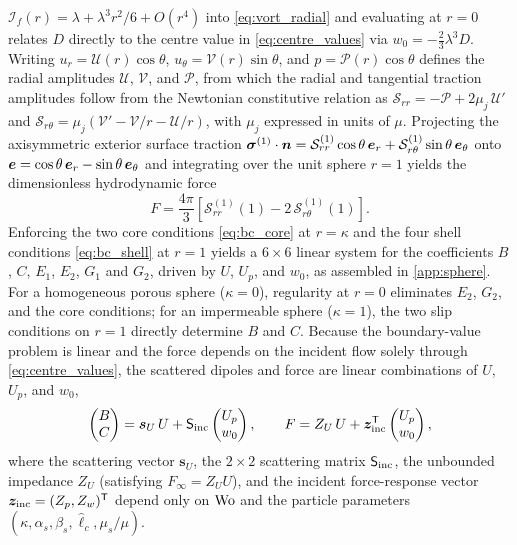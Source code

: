 $\mathcal I_f(r)=\lambda+\lambda^3r^2/6+O(r^4)$ into \cref{eq:vort_radial} and evaluating at $r=0$ relates $D$ directly to
the centre value in \cref{eq:centre_values} via $w_0=-\tfrac23\lambda^3D$. Writing $u_r=\mathcal U(r)\cos\theta$,
$u_\theta=\mathcal V(r)\sin\theta$, and $p=\mathcal P(r)\cos\theta$ defines the radial amplitudes $\mathcal U$, $\mathcal V$,
and $\mathcal P$, from which the radial and tangential traction amplitudes follow from the Newtonian constitutive relation
as $\mathcal S_{rr}=-\mathcal P+2\mu_j\,\mathcal U'$ and
$\mathcal S_{r\theta}=\mu_j(\mathcal V'-\mathcal V/r-\mathcal U/r)$, with $\mu_j$ expressed in units of $\mu$. Projecting
the axisymmetric exterior surface traction $\bm{\sigma}^{(1)}\cdot\bm{n}=\mathcal S^{(1)}_{rr}\cos\theta\,\bm{e}_r+\mathcal
S^{(1)}_{r\theta}\sin\theta\,\bm{e}_\theta$ onto $\bm{e}=\cos\theta\,\bm{e}_r-\sin\theta\,\bm{e}_\theta$ and integrating over the unit
sphere $r=1$ yields the dimensionless hydrodynamic force
\begin{equation}
  F=\frac{4\pi}{3}\left[\mathcal S^{(1)}_{rr}(1)-2\,\mathcal S^{(1)}_{r\theta}(1)\right].
  \label{eq:force_amplitudes}
\end{equation}
Enforcing the two core conditions \cref{eq:bc_core} at $r=\kappa$ and the four shell conditions \cref{eq:bc_shell} at
$r=1$ yields a $6\times6$ linear system for the coefficients $B$, $C$, $E_1$, $E_2$, $G_1$ and $G_2$, driven by $U$,
$U_p$, and $w_0$, as assembled in \cref{app:sphere}. For a homogeneous porous sphere ($\kappa=0$), regularity at $r=0$
eliminates $E_2$, $G_2$, and the core conditions; for an impermeable sphere ($\kappa=1$), the two slip conditions on
$r=1$ directly determine $B$ and $C$. Because the boundary-value problem is linear and the force depends on the incident
flow solely through \cref{eq:centre_values}, the scattered dipoles and force are linear combinations of $U$, $U_p$, and
$w_0$,
\begin{equation}
  \begin{pmatrix}B\\ C\end{pmatrix}=\bm s_U\,U+\mathsf S_{\rm inc}\begin{pmatrix}U_p\\ w_0\end{pmatrix},
  \qquad
  F=Z_U\,U+\bm z_{\rm inc}^{\mathsf T}\begin{pmatrix}U_p\\ w_0\end{pmatrix},
  \label{eq:response}
\end{equation}
where the scattering vector $\bm s_U$, the $2\times2$ scattering matrix $\mathsf S_{\rm inc}$, the unbounded impedance
$Z_U$ (satisfying $F_\infty=Z_UU$), and the incident force-response vector $\bm z_{\rm inc}=(Z_p,Z_w)^{\mathsf T}$ depend
only on $\mathrm{Wo}$ and the particle parameters $(\kappa,\alpha_s,\beta_s,\hat\ell_c,\mu_s/\mu)$.

